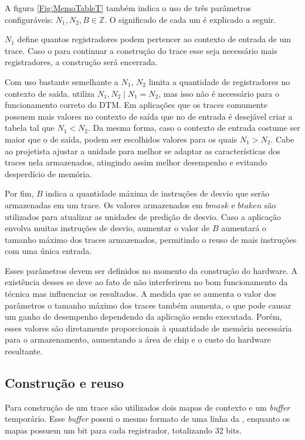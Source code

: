 A figura \ref{Fig:MemoTableT} também indica o uso de três parâmetros configuráveis: $N_{1}, N_{2}, B  \in \mathbb{Z}$. O significado de cada um é explicado a seguir.

$N_{1}$ define quantos registradores podem pertencer ao contexto de entrada de um trace. Caso o para continuar a construção do trace esse seja necessário mais registradores, a construção será encerrada. 

Com uso bastante semelhante a $N_{1}$, $N_{2}$ limita a quantidade de registradores no contexto de saída.  utiliza $N_{1}, N_{2} \mid N_{1} = N_{2}$, mas isso não é necessário para o funcionamento correto do DTM. Em aplicações que os traces comumente possuem mais valores no contexto de saída que no de entrada é desejável criar a tabela tal que $N_{1} < N_{2}$. Da mesma forma, caso o contexto de entrada costume ser maior que o de saída, podem ser escolhidos valores para os quais $N_{1} > N_{2}$. Cabe ao projetista ajustar a unidade para melhor se adaptar as características dos traces nela armazenados, atingindo assim melhor desempenho e evitando desperdício de memória.

Por fim, $B$ indica a quantidade máxima de instruções de desvio que serão armazenadas em um trace. Os valores armazenados em $bmask$ e $btaken$ são utilizados para atualizar as unidades de predição de desvio. Caso a aplicação envolva muitas instruções de desvio, aumentar o valor de $B$ aumentará o tamanho máximo dos traces armazenados, permitindo o reuso de mais instruções com uma única entrada.

Esses parâmetros devem ser definidos no momento da construção do hardware. A existência desses se deve ao fato de não interferirem no bom funcionamento da técnica mas influenciar os resultados. A medida que se aumenta o valor dos parâmetros o tamanho máximo dos traces também aumenta, o que pode causar um ganho de desempenho dependendo da aplicação sendo executada. Porém, esses valores são diretamente proporcionais à quantidade de memória necessária para o armazenamento, aumentando a área de chip e o custo do hardware resultante.


\subsection{Construção e reuso}
\label{Fundamentacao:DTMHardware:Integracao}

Para construção de um trace são utilizados dois mapas de contexto e um \textit{buffer} temporário. Esse \textit{buffer} possui o mesmo formato de uma linha da \tablet, enquanto os mapas possuem um bit para cada registrador, totalizando 32 bits.

